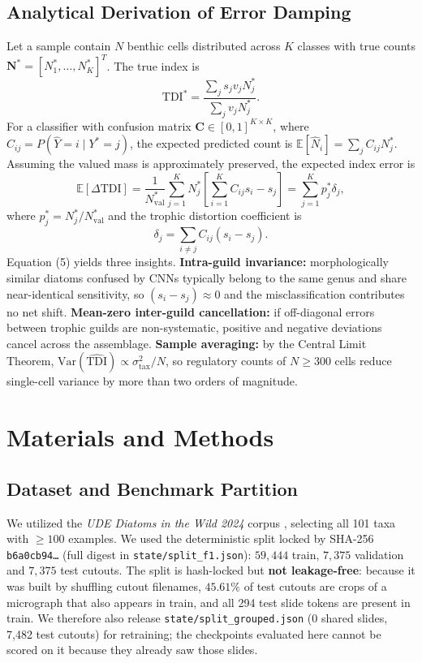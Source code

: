 \documentclass[10pt,twocolumn,a4paper]{article}
\begin{document}
\subsection{Analytical Derivation of Error Damping}
Let a sample contain $N$ benthic cells distributed across $K$ classes with true counts $\mathbf{N}^* = [N_1^*, \dots, N_K^*]^T$. The true index is
\begin{equation}
\text{TDI}^* = \frac{\sum_j s_j v_j N_j^*}{\sum_j v_j N_j^*}.
\end{equation}
For a classifier with confusion matrix $\mathbf{C} \in [0, 1]^{K \times K}$, where $C_{ij} = P(\hat{Y} = i \mid Y^* = j)$, the expected predicted count is $\mathbb{E}[\hat{N}_i] = \sum_j C_{ij} N_j^*$. Assuming the valued mass is approximately preserved, the expected index error is
\begin{equation}
\mathbb{E}[\Delta \text{TDI}] = \frac{1}{N_{\text{val}}^*} \sum_{j=1}^{K} N_j^* \left[ \sum_{i=1}^{K} C_{ij} s_i - s_j \right] = \sum_{j=1}^{K} p_j^* \delta_j,
\end{equation}
where $p_j^* = N_j^* / N_{\text{val}}^*$ and the trophic distortion coefficient is
\begin{equation}
\delta_j = \sum_{i \neq j} C_{ij} (s_i - s_j).
\end{equation}
Equation (5) yields three insights. \textbf{Intra-guild invariance:} morphologically similar diatoms confused by CNNs typically belong to the same genus and share near-identical sensitivity, so $(s_i - s_j) \approx 0$ and the misclassification contributes no net shift. \textbf{Mean-zero inter-guild cancellation:} if off-diagonal errors between trophic guilds are non-systematic, positive and negative deviations cancel across the assemblage. \textbf{Sample averaging:} by the Central Limit Theorem, $\mathrm{Var}(\widehat{\text{TDI}}) \propto \sigma_{\text{tax}}^2 / N$, so regulatory counts of $N \ge 300$ cells reduce single-cell variance by more than two orders of magnitude.

\section{Materials and Methods}

\subsection{Dataset and Benchmark Partition}
We utilized the \textit{UDE Diatoms in the Wild 2024} corpus \cite{venkataramanan2024ude}, selecting all 101 taxa with $\ge 100$ examples. We used the deterministic split locked by SHA-256 \texttt{b6a0cb94\ldots} (full digest in \texttt{state/split\_f1.json}): $59,444$ train, $7,375$ validation and $7,375$ test cutouts. The split is hash-locked but \textbf{not leakage-free}: because it was built by shuffling cutout filenames, $45.61\%$ of test cutouts are crops of a micrograph that also appears in train, and all 294 test slide tokens are present in train. We therefore also release \texttt{state/split\_grouped.json} (0 shared slides, 7,482 test cutouts) for retraining; the checkpoints evaluated here cannot be scored on it because they already saw those slides.
\end{document}
